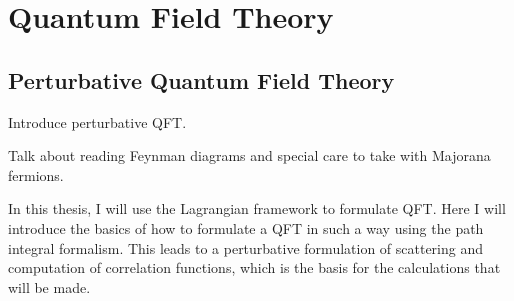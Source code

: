 \documentclass[../main.tex]{subfiles}
\begin{document}
\chapter{Quantum Field Theory}





\section{Perturbative Quantum Field Theory}

\begin{TODO}
  \item Introduce perturbative QFT.
  \item Talk about reading Feynman diagrams and special care to take with
  Majorana fermions.
\end{TODO}

In this thesis, I will use the Lagrangian framework to formulate QFT.
Here I will introduce the basics of how to formulate a QFT in such a way using the path integral formalism.
This leads to a perturbative formulation of scattering and computation of correlation functions, which is the basis for the calculations that will be made. \medskip
\end{document}
